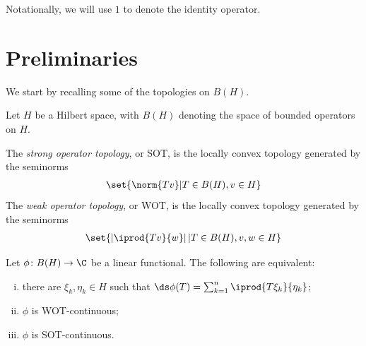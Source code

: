 \documentclass[10pt]{mypackage}
\begin{document}
\RaggedRight
Notationally, we will use $1$ to denote the identity operator.
\tableofcontents
\section{Preliminaries}%
We start by recalling some of the topologies on $B(H)$.
\begin{definition}
  Let $H$ be a Hilbert space, with $B(H)$ denoting the space of bounded operators on $H$.

  The \textit{strong operator topology}, or SOT, is the locally convex topology generated by the seminorms 
  \begin{align*}
    \set{\norm{Tv} | T\in B(H),v\in H}
  \end{align*}
  The \textit{weak operator topology}, or WOT, is the locally convex topology generated by the seminorms 
  \begin{align*}
    \set{ \left\vert \iprod{Tv}{w} \right\vert | T\in B(H),v,w\in H }
  \end{align*}
\end{definition}
\begin{theorem}
  Let $\phi\colon B(H)\rightarrow \C$ be a linear functional. The following are equivalent:
  \begin{enumerate}[(i)]
    \item there are $\xi_k,\eta_k\in H$ such that $\ds \phi(T) = \sum_{k=1}^{n} \iprod{T\xi_k}{\eta_k}$;
    \item $\phi$ is WOT-continuous;
    \item $\phi$ is SOT-continuous.
  \end{enumerate}
\end{theorem}
\end{document}
